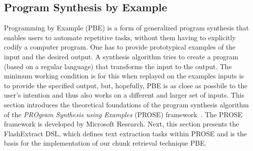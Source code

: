 \subsection{Program Synthesis by Example}
\label{sec:rw-prose}

Programming by Example (PBE) is a form of generalized program synthesis that enables users to automate repetitive tasks, without them having to explicitly codify a computer program. One has to provide prototypical examples of the input and the desired output. A
synthesis algorithm tries to create a program (based on a regular language) that transforms the input to the output. The minimum working condition is for this when replayed on the examples inputs is to provide the specified output, but, hopefully, PBE is as close as possbile to the user's intention and thus also works on a different and larger set of inputs.
This section introduces the theoretical foundations of the program synthesis
algorithm of the \emph{PROgram Synthesis using Examples} (PROSE) framework~\cite{prose2019webpage}.
The PROSE framework is developed by Microsoft Research.
Next, this section presents the FlashExtract DSL, which defines text extraction
tasks within PROSE and is the basis for the implementation of our chunk retrieval technique PBE\@.

